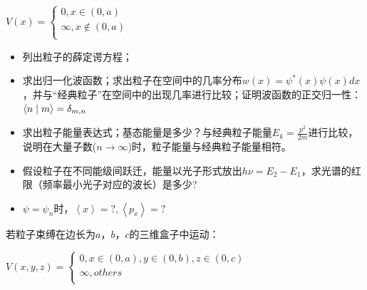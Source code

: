 \begin{center}
$V(x) = \left\{ \begin{array}{l}
 0,x \in \left( {0,a} \right) \\
 \infty ,x \notin \left( {0,a} \right) \\
 \end{array} \right.$
\end{center}
\begin{itemize}
    \item 列出粒子的薛定谔方程；

    \item 求出归一化波函数；求出粒子在空间中的几率分布$w(x) = \psi ^* (x)\psi (x)dx$，并与``经典粒子''在空间中的出现几率进行比较；证明波函数的正交归一性：$\left\langle {n}
 \mathrel{\left | {\vphantom {n m}}
 \right. \kern-\nulldelimiterspace}
 {m} \right\rangle  = \delta _{m,n} $

    \item 求出粒子能量表达式；基态能量是多少？与经典粒子能量$E_k  = \frac{{p^2 }}{{2m}}$进行比较，说明在大量子数($n \to \infty $)时，粒子能量与经典粒子能量相符。

    \item 假设粒子在不同能级间跃迁，能量以光子形式放出$h\nu  = E_2  - E_1 $，求光谱的红限（频率最小光子对应的波长）是多少?

    \item $\psi  = \psi _n $时，$\left\langle x \right\rangle  = ?,\left\langle {p_x } \right\rangle  = ?$

\end{itemize}

若粒子束缚在边长为$a$，$b$，$c$的三维盒子中运动：

\begin{center}
$V(x,y,z) = \left\{ \begin{array}{l}
 0,x \in \left( {0,a} \right),y \in \left( {0,b} \right),z \in (0,c) \\
 \infty ,others \\
 \end{array} \right.$
\end{center}

